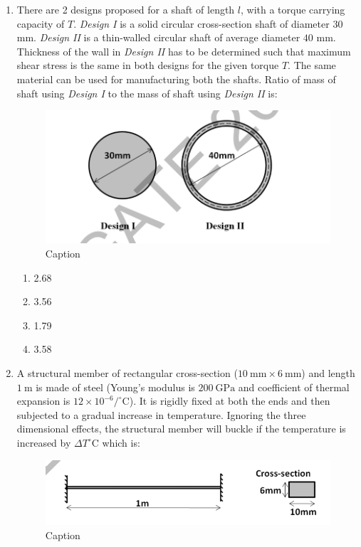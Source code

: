 \documentclass[journal]{IEEEtran}
\begin{document}
\begin{enumerate}
\item \quad There are 2 designs proposed for a shaft of length $l$, with a torque carrying capacity of $T$. \textit{Design I} is a solid circular cross-section shaft of diameter $30$ mm. \textit{Design II} is a thin-walled circular shaft of average diameter $40$ mm. Thickness of the wall in \textit{Design II} has to be determined such that maximum shear stress is the same in both designs for the given torque $T$. The same material can be used for manufacturing both the shafts. Ratio of mass of shaft using \textit{Design I} to the mass of shaft using \textit{Design II} is:

\begin{figure}[H]
    \centering
    \includegraphics[width=0.5\columnwidth]{Figs/q49.png}
    \caption{Caption}
    \label{fig:placeholder}
\end{figure}

\begin{multicols}{2}
\begin{enumerate}
    \item 2.68
    \item 3.56
    \item 1.79
    \item 3.58
\end{enumerate}
\end{multicols}
\hfill{}

\item \quad A structural member of rectangular cross-section ($10\ \mathrm{mm} \times 6\ \mathrm{mm}$) and length $1\ \mathrm{m}$ is made of steel (Young's modulus is $200\ \mathrm{GPa}$ and coefficient of thermal expansion is $12 \times 10^{-6} / ^\circ\mathrm{C}$). It is rigidly fixed at both the ends and then subjected to a gradual increase in temperature. Ignoring the three dimensional effects, the structural member will buckle if the temperature is increased by $\Delta T ^\circ\mathrm{C}$ which is:

\begin{figure}[H]
    \centering
    \includegraphics[width=0.5\columnwidth]{Figs/Q50.png}
    \caption{Caption}
    \label{fig:placeholder}
\end{figure}


\end{enumerate}
\end{document}
